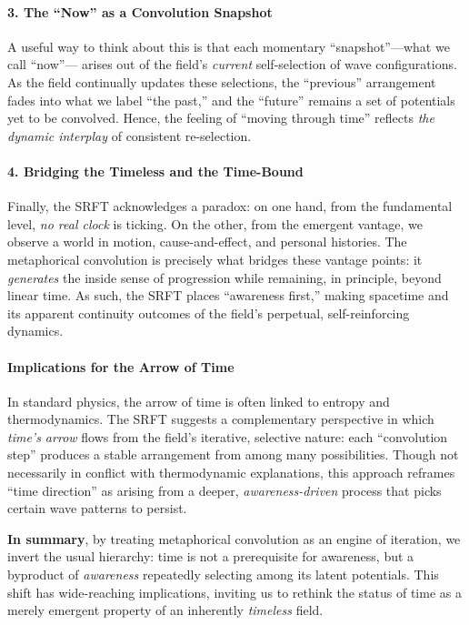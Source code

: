 \documentclass[12pt,a4paper]{article}
\begin{document}
\paragraph{3. The “Now” as a Convolution Snapshot}
A useful way to think about this is that each momentary “snapshot”---what we call “now”--- 
arises out of the field’s \emph{current} self-selection of wave configurations. 
As the field continually updates these selections, the “previous” arrangement fades 
into what we label “the past,” and the “future” remains a set of potentials yet to be 
convolved. Hence, the feeling of “moving through time” reflects 
\emph{the dynamic interplay} of consistent re-selection.

\paragraph{4. Bridging the Timeless and the Time-Bound}
Finally, the SRFT acknowledges a paradox: on one hand, from the fundamental level, 
\emph{no real clock} is ticking. On the other, from the emergent vantage, 
we observe a world in motion, cause-and-effect, and personal histories. 
The metaphorical convolution is precisely what bridges these vantage points: 
it \emph{generates} the inside sense of progression while remaining, in principle, 
beyond linear time. As such, the SRFT places “awareness first,” making spacetime 
and its apparent continuity outcomes of the field’s perpetual, self-reinforcing 
dynamics.

\paragraph{Implications for the Arrow of Time}
In standard physics, the arrow of time is often linked to entropy and thermodynamics. 
The SRFT suggests a complementary perspective in which \emph{time’s arrow} 
flows from the field’s iterative, selective nature: each “convolution step” 
produces a stable arrangement from among many possibilities. Though not necessarily 
in conflict with thermodynamic explanations, this approach reframes “time direction” 
as arising from a deeper, \emph{awareness-driven} process that picks certain 
wave patterns to persist.

\medskip

\noindent
\textbf{In summary}, by treating metaphorical convolution as an engine of iteration, 
we invert the usual hierarchy: time is not a prerequisite for awareness, 
but a byproduct of \emph{awareness} repeatedly selecting among its latent potentials. 
This shift has wide-reaching implications, inviting us to rethink the status of time 
as a merely emergent property of an inherently \emph{timeless} field.
\end{document}
